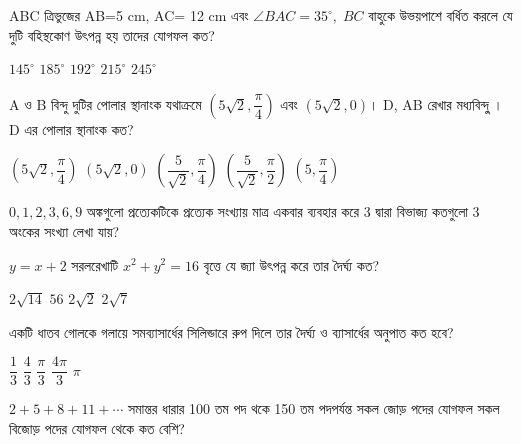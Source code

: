 \documentclass[addpoints]{exam}
\begin{document}
\begin{questions}
\question ABC ত্রিভুজের AB=5 cm, AC= 12 cm এবং $ \angle BAC = 35^{\circ},\; BC $ বাহুকে উভয়পাশে বর্ধিত করলে যে দুটি বহিস্থকোণ উৎপন্ন হয় তাদের যোগফল কত?

\begin{oneparchoices}
\choice $ 145^{\circ} $
\choice $ 185^{\circ} $
\choice $ 192^{\circ} $
\choice $ 215^{\circ} $
\choice $ 245^{\circ} $
\end{oneparchoices}

\question  A ও B বিন্দু দুটির পোলার স্থানাংক যথাক্রমে $ (5\sqrt{2}, \dfrac{\pi}{4}) $ এবং $ (5\sqrt{2}, 0) $।  D, AB রেখার মধ্যবিন্দু্ । D এর পোলার স্থানাংক কত?

\begin{oneparchoices}
\choice $ (5\sqrt{2}, \dfrac{\pi}{4}) $
\choice $ (5\sqrt{2}, 0) $
\choice $ (\dfrac{5}{\sqrt{2}}, \dfrac{\pi}{4}) $
\choice $ (\dfrac{5}{\sqrt{2}}, \dfrac{\pi}{2}) $
\choice $ (5, \dfrac{\pi}{4}) $
\end{oneparchoices}

\question  $ 0,1,2,3,6,9 $ অঙ্কগুলো প্রত্যেকটিকে প্রত্যেক সংখ্যায় মাত্র একবার ব্যবহার করে 3 দ্বারা বিভাজ্য কতগুলো 3 অংকের সংখ্যা লেখা যায়?

\begin{oneparchoices}
\end{oneparchoices}

\question  $ y=x+2 $ সরলরেখাটি $ x^{2}+y^{2}=16 $ বৃত্তে যে জ্যা উৎপন্ন করে তার দৈর্ঘ্য কত?

\begin{oneparchoices}
\choice $ 2\sqrt{14} $ 
\choice $ 56 $
\choice $ 2\sqrt{2} $
\choice $ 2\sqrt{7} $
\end{oneparchoices}

\question  একটি ধাতব গোলকে গলায়ে সমব্যাসার্ধের সিলিন্ডারে রুপ দিলে তার দৈর্ঘ্য ও ব্যাসার্ধের অনুপাত কত হবে?

\begin{oneparchoices}
\choice $ \dfrac{1}{3} $
\choice $ \dfrac{4}{3} $
\choice $ \dfrac{\pi}{3} $
\choice $ \dfrac{4\pi}{3} $
\choice $ \pi $
\end{oneparchoices}

\question  $ 2+5+8+11+\cdots $ সমান্তর ধারার 100 তম পদ থকে 150 তম পদপর্যন্ত সকল জোড় পদের যোগফল সকল বিজোড় পদের যোগফল থেকে কত বেশি?

\begin{oneparchoices}
\end{oneparchoices}


\end{questions}
\end{document}
